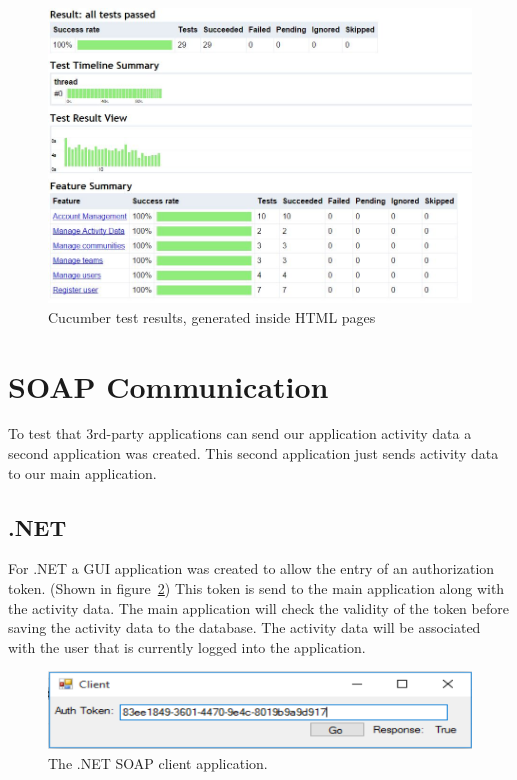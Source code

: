 \begin{figure}[H]
\begin{center}
\includegraphics[scale=0.6]{images/testing/specflowResults.jpg} 
\caption{Cucumber test results, generated inside HTML pages}
\label{fig:testing_html_results}
\end{center}
\end{figure}

\section{SOAP Communication}
To test that 3rd-party applications can send our application activity data a second application was created. This second application just sends activity data to our main application. 

\subsection{.NET}
For .NET a GUI application was created to allow the entry of an authorization token. (Shown in figure~\ref{fig:testing_authTokenNet}) This token is send to the main application along with the activity data. The main application will check the validity of the token before saving the activity data to the database. The activity data will be associated with the user that is currently logged into the application.

\begin{figure}[H]
\begin{center}
\includegraphics[scale=0.3]{images/testing/clientAuthTokenNET.png} 
\caption{The .NET SOAP client application.}
\label{fig:testing_authTokenNet}
\end{center}
\end{figure}


